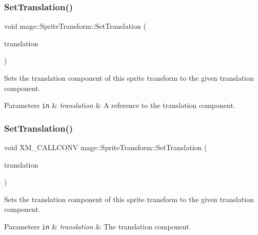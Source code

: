 \subsubsection{\texorpdfstring{Set\+Translation()}{SetTranslation()}\hspace{0.1cm}{\footnotesize\ttfamily [2/3]}}
{\footnotesize\ttfamily void mage\+::\+Sprite\+Transform\+::\+Set\+Translation (\begin{DoxyParamCaption}\item[{const X\+M\+F\+L\+O\+A\+T2 \&}]{translation }\end{DoxyParamCaption})\hspace{0.3cm}{\ttfamily [noexcept]}}

Sets the translation component of this sprite transform to the given translation component.


\begin{DoxyParams}[1]{Parameters}
\mbox{\tt in}  & {\em translation} & A reference to the translation component. \\
\hline
\end{DoxyParams}
\hypertarget{structmage_1_1_sprite_transform_a597ef325d25183a969915be48d0a99f7}{}\label{structmage_1_1_sprite_transform_a597ef325d25183a969915be48d0a99f7} 
\subsubsection{\texorpdfstring{Set\+Translation()}{SetTranslation()}\hspace{0.1cm}{\footnotesize\ttfamily [3/3]}}
{\footnotesize\ttfamily void X\+M\+\_\+\+C\+A\+L\+L\+C\+O\+NV mage\+::\+Sprite\+Transform\+::\+Set\+Translation (\begin{DoxyParamCaption}\item[{F\+X\+M\+V\+E\+C\+T\+OR}]{translation }\end{DoxyParamCaption})\hspace{0.3cm}{\ttfamily [noexcept]}}

Sets the translation component of this sprite transform to the given translation component.


\begin{DoxyParams}[1]{Parameters}
\mbox{\tt in}  & {\em translation} & The translation component. \\
\hline
\end{DoxyParams}
\hypertarget{structmage_1_1_sprite_transform_a264429e570d9f7a28478c366d1477a8f}{}\label{structmage_1_1_sprite_transform_a264429e570d9f7a28478c366d1477a8f} 
